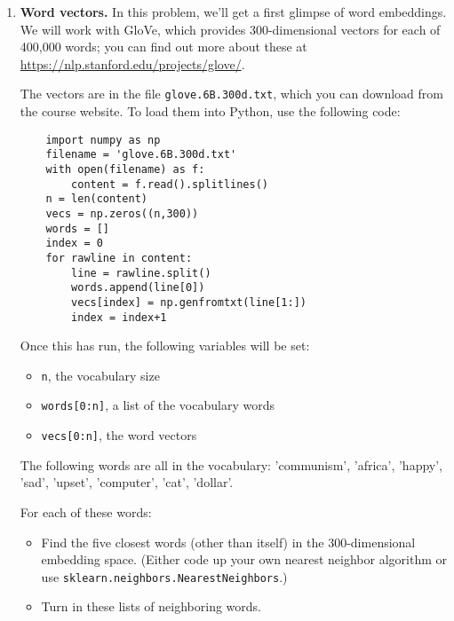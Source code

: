 \documentclass{article}
\begin{document}
\begin{enumerate}
\item \textbf{Word vectors.} In this problem, we'll get a first glimpse of word embeddings. We will work with GloVe, which provides 300-dimensional vectors for each of 400,000 words; you can find out more about these at \url{https://nlp.stanford.edu/projects/glove/}.

    The vectors are in the file \texttt{glove.6B.300d.txt}, which you can download from the course website. To load them into Python, use the following code:
    \begin{verbatim}
    import numpy as np
    filename = 'glove.6B.300d.txt'
    with open(filename) as f:
        content = f.read().splitlines()
    n = len(content)
    vecs = np.zeros((n,300))
    words = []
    index = 0
    for rawline in content:
        line = rawline.split()
        words.append(line[0])
        vecs[index] = np.genfromtxt(line[1:])
        index = index+1
    \end{verbatim}

    Once this has run, the following variables will be set:
    \begin{itemize}
    \item \texttt{n}, the vocabulary size
    \item \texttt{words[0:n]}, a list of the vocabulary words
    \item \texttt{vecs[0:n]}, the word vectors
    \end{itemize}

    The following words are all in the vocabulary: 'communism', 'africa', 'happy', 'sad', 'upset', 'computer', 'cat', 'dollar'.

    For each of these words:
    \begin{itemize}
    \item Find the five closest words (other than itself) in the 300-dimensional embedding space. (Either code up your own nearest neighbor algorithm or use \texttt{sklearn.neighbors.NearestNeighbors}.)
    \item Turn in these lists of neighboring words.
    \end{itemize}

\end{enumerate}
\end{document}
